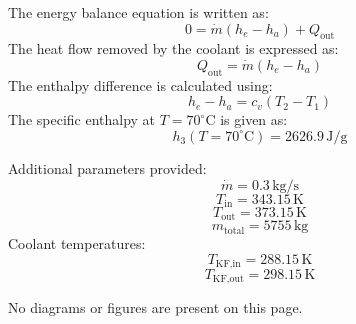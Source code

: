 The energy balance equation is written as:  
\[
0 = \dot{m} (h_e - h_a) + Q_{\text{out}}
\]  
The heat flow removed by the coolant is expressed as:  
\[
Q_{\text{out}} = \dot{m} (h_e - h_a)
\]  
The enthalpy difference is calculated using:  
\[
h_e - h_a = c_v (T_2 - T_1)
\]  
The specific enthalpy at \( T = 70^\circ\text{C} \) is given as:  
\[
h_3(T = 70^\circ\text{C}) = 2626.9 \, \text{J/g}
\]  

Additional parameters provided:  
\[
\dot{m} = 0.3 \, \text{kg/s}
\]  
\[
T_{\text{in}} = 343.15 \, \text{K}
\]  
\[
T_{\text{out}} = 373.15 \, \text{K}
\]  
\[
m_{\text{total}} = 5755 \, \text{kg}
\]  
Coolant temperatures:  
\[
T_{\text{KF,in}} = 288.15 \, \text{K}
\]  
\[
T_{\text{KF,out}} = 298.15 \, \text{K}
\]  

No diagrams or figures are present on this page.